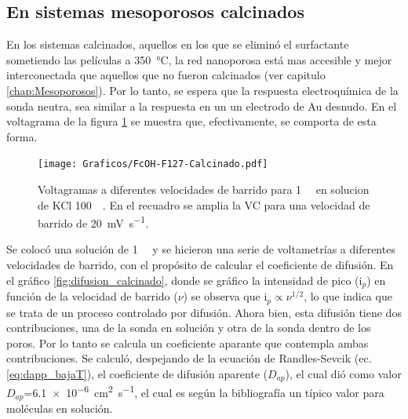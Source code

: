 	\subsection{En sistemas mesoporosos calcinados}

	 En los sistemas calcinados, aquellos en los que se eliminó el surfactante sometiendo las películas a \SI{350}{\celsius}, la red nanoporosa está mas accesible y mejor interconectada que aquellos que no fueron calcinados (ver capitulo \ref{chap:Mesoporosos}). Por lo tanto, se espera que la respuesta electroquímica de la sonda neutra, sea similar a la respuesta en un un electrodo de Au desnudo. En el voltagrama de la figura \ref{fig:fc_calcinado} se muestra que, efectivamente, se comporta de esta forma. 

	 	\begin{figure}[ht]
				\centering
		 	    \texttt{[image: Graficos/FcOH-F127-Calcinado.pdf]}
		        \caption[Voltagrama para \fc\space en \pdm\space calcinadas]{Voltagramas a diferentes velocidades de barrido para \fc\space \SI{1}{\milli\Molar} en solucion de KCl \SI{100}{\milli\Molar}. En el recuadro se amplia la VC para una velocidad de barrido de \SI{20}{\milli\volt\per\second}.}
		        \label{fig:fc_calcinado}
		      	\end{figure}



	 Se colocó una solución de \fc\space \SI{1}{\milli\Molar} y se hicieron una serie de voltametrías a diferentes velocidades de barrido, con el propósito de calcular el coeficiente de difusión. En el gráfico \ref{fig:difusion_calcinado}, donde se gráfico la intensidad de pico (i$_p$) en función de la velocidad de barrido ($\nu$) se observa que $\text{i}_p \propto \nu^{1/2}$, lo que indica que se trata de un proceso controlado por difusión. Ahora bien, esta difusión tiene dos contribuciones, una de la sonda en solución y otra de la sonda dentro de los poros. Por lo tanto se calcula un coeficiente aparante que contempla ambas contribuciones. Se calculó, despejando de la ecuación de Randles-Sevcik (ec. \ref{eq:dapp_bajaT}), el coeficiente de difusión aparente ($D_{ap}$), el cual dió como valor $D_{ap}$=\SI{6,1e-6}{\square\cm\per\second}, el cual es según la bibliografía un típico valor para moléculas en solución. \cite{koryta1993,Otal2006}

